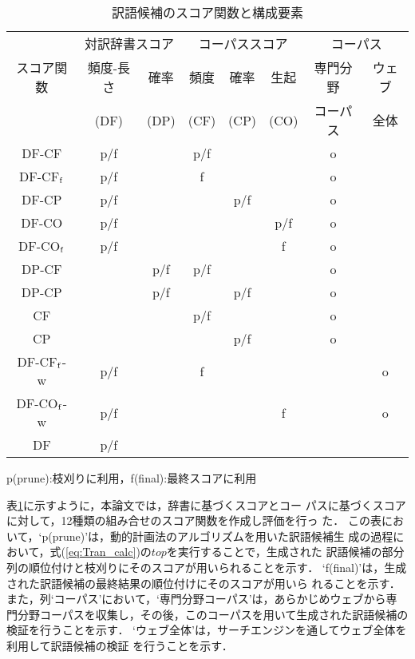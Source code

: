 \documentclass[japanese]{jnlp_1.3a}
\begin{document}
\begin{table}[b]
 \small
 \centering
 \caption{訳語候補のスコア関数と構成要素}
 \label{tab:param_method}
\begin{tabular}{|c||c|c||c|c|c||c|c|}
 \hline
 & \multicolumn{2}{|c||}{対訳辞書スコア} &
 \multicolumn{3}{|c||}{コーパススコア} & \multicolumn{2}{|c|}{コーパス}\\
 \cline{2-8}
 スコア関数 & 頻度-長さ & 確率 & 頻度 & 確率 & 生起 & 専門分野 & ウェブ \\
 & (DF) & (DP) & (CF) & (CP) & (CO) & コーパス & 全体 \\
 \hline
 \hline
 DF-CF     &  p/f &  & p/f & & & o &\\  
 \hline
 DF-CF${\rm _f}$    &  p/f &  & f & & & o &\\  
 \hline
 DF-CP     & p/f & & & p/f & & o & \\  
 \hline
 DF-CO     & p/f & & & & p/f & o & \\  
 \hline
 DF-CO${\rm _f}$     & p/f & & & & f & o & \\  
 \hline
 DP-CF     & & p/f & p/f & & & o & \\  
 \hline
 DP-CP     & & p/f & & p/f & & o & \\  
 \hline
 CF        &  &  &  p/f & & & o &\\  
 \hline
 CP        &  &  &  & p/f & & o &\\  
 \hline \hline
 DF-CF${\rm _f}$-w  &  p/f &  & f & & & & o\\  
 \hline
 DF-CO${\rm _f}$-w  &  p/f &  &  & & f & & o\\  
 \hline \hline
 DF        & p/f &  &  & &  & & \\  
 \hline
\end{tabular}
\vspace{4pt}

p(prune):枝刈りに利用，f(final):最終スコアに利用
\end{table}

表\ref{tab:param_method}に示すように，本論文では，辞書に基づくスコアとコー
パスに基づくスコアに対して，12種類の組み合せのスコア関数を作成し評価を行っ
た．
この表において，`p(prune)'は，動的計画法のアルゴリズムを用いた訳語候補生
成の過程において，式(\ref{eq:Tran_calc})の$top$を実行することで，生成された
訳語候補の部分列の順位付けと枝刈りにそのスコアが用いられることを示す．
`f(final)'は，生成された訳語候補の最終結果の順位付けにそのスコアが用いら
れることを示す．
また，列`コーパス'において，`専門分野コーパス'は，あらかじめウェブから専
門分野コーパスを収集し，その後，このコーパスを用いて生成された訳語候補の
検証を行うことを示す．
`ウェブ全体'は，サーチエンジンを通してウェブ全体を利用して訳語候補の検証
を行うことを示す．
\end{document}
